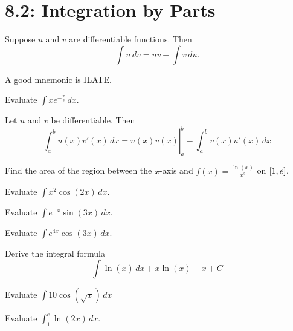 \documentclass[../mathNotesPreamble]{subfiles}
\begin{document}
  \section{8.2: Integration by Parts}
  \begin{thmBox*}
    Suppose $u$ and $v$ are differentiable functions. Then
      \[\int u\,dv=uv-\int v\,du.\]
  \end{thmBox*}
  A good mnemonic is ILATE.
  \pagebreak

  \begin{ex*}
    Evaluate $\displaystyle\int xe^{-\frac{x}{2}}\,dx$.
  \end{ex*}
  \pagebreak

  \begin{thmBox*}
    Let $u$ and $v$ be differentiable. Then
      \[\left.\int_a^b u(x) v'(x)\,dx= u(x)v(x)\right|_a^b -\int_a^b v(x)u'(x)\,dx\]
  \end{thmBox*}
  \begin{ex*}
    Find the area of the region between the $x$-axis and $f(x)=\displaystyle\frac{\ln(x)}{x^2}$ on ${\left[1,e\right]}$.
  \end{ex*}
  \pagebreak

  \begin{ex*}
    Evaluate $\displaystyle\int x^2 \cos(2x)\,dx$.
  \end{ex*}
  \pagebreak

  \begin{ex*}
    Evaluate $\displaystyle\int e^{-x}\sin(3x)\,dx$.
  \end{ex*}
  \pagebreak

  \begin{ex*}
    Evaluate $\displaystyle\int e^{4x}\cos(3x)\,dx$.
  \end{ex*}
  \pagebreak

  \begin{ex*}
    Derive the integral formula 
      \[\int \ln(x)\,dx+x\ln(x)-x+C\]
  \end{ex*}

  \begin{ex*}
    Evaluate $\displaystyle\int10\cos(\sqrt{x})\,dx$
  \end{ex*}
  \pagebreak

  \begin{ex*}
    Evaluate $\displaystyle \int_1^e \ln(2x)\,dx$.
  \end{ex*}
  \pagebreak
\end{document}
